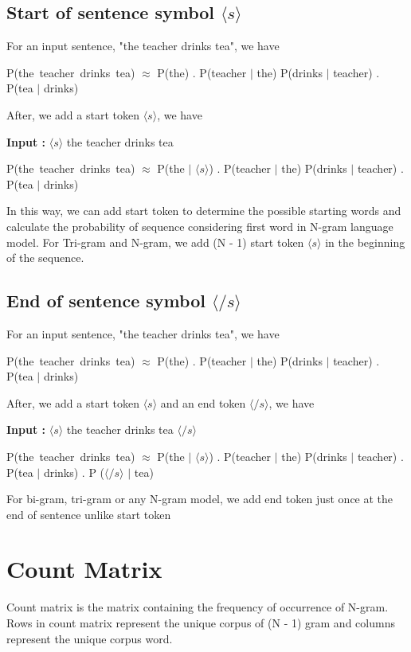 \subsection{Start of sentence symbol $\langle s \rangle$}
For an input sentence, "the teacher drinks tea", we have

P(the\, teacher\, drinks\, tea) $\approx$ P(the) . P(teacher \(|\) the) P(drinks \(|\) teacher) . P(tea \(|\) drinks)

After, we add a start token $\langle s \rangle$, we have

\textbf{Input : } $\langle s \rangle$ the teacher drinks tea

P(the\, teacher\, drinks\, tea) $\approx$ P(the \(|\) $\langle s \rangle$) . P(teacher \(|\) the) P(drinks \(|\) teacher) . P(tea \(|\) drinks)

In this way, we can add start token to determine the possible starting words and calculate the probability of sequence considering first word in N-gram language model. For Tri-gram and N-gram, we add (N - 1) start token $\langle s \rangle$ in the beginning of the sequence.

\subsection{End of sentence symbol $\langle /s \rangle$}
For an input sentence, "the teacher drinks tea", we have

P(the\, teacher\, drinks\, tea) $\approx$ P(the) . P(teacher \(|\) the) P(drinks \(|\) teacher) . P(tea \(|\) drinks)

After, we add a start token $\langle s \rangle$ and an end token $\langle /s \rangle$, we have

\textbf{Input : } $\langle s \rangle$ the teacher drinks tea $\langle /s \rangle$

P(the\, teacher\, drinks\, tea) $\approx$ P(the \(|\) $\langle s \rangle$) . P(teacher \(|\) the) P(drinks \(|\) teacher) . P(tea \(|\) drinks) . P ($\langle /s \rangle$ \(|\) tea)

For bi-gram, tri-gram or any N-gram model, we add end token just once at the end of sentence unlike start token


\section{Count Matrix}
Count matrix is the matrix containing the frequency of occurrence of N-gram. Rows in count matrix represent the unique corpus of (N - 1) gram and columns represent the unique corpus word.

